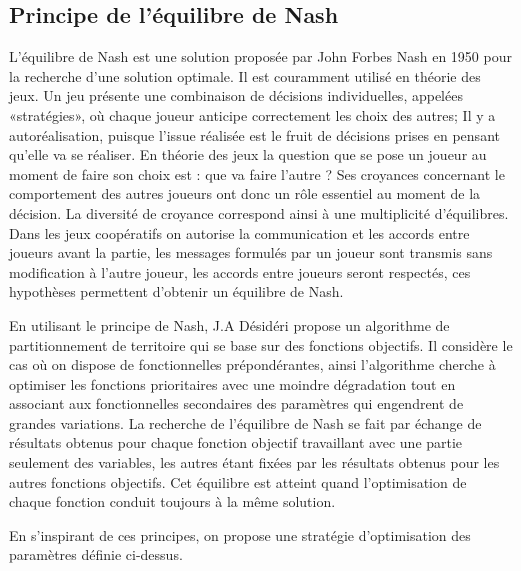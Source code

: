 
 \subsection{Principe de l’\'{e}quilibre de Nash}
 
L'\'{e}quilibre de Nash est une solution propos\'{e}e par John Forbes Nash en 1950 \citep{depriester1950johnnash} pour la recherche d’une solution optimale. Il est couramment utilis\'{e} en th\'{e}orie des jeux. Un jeu pr\'{e}sente une combinaison de d\'{e}cisions individuelles, appel\'{e}es «strat\'{e}gies», où chaque joueur anticipe correctement les choix des autres; Il y a autor\'{e}alisation, puisque l'issue r\'{e}alis\'{e}e est le fruit de d\'{e}cisions prises en pensant qu'elle va se r\'{e}aliser. En th\'{e}orie des jeux la question que se pose un joueur au moment de faire son choix est : que va faire l'autre ? Ses croyances concernant le comportement des autres joueurs ont donc un rôle essentiel au moment de la d\'{e}cision. La diversit\'{e} de croyance correspond ainsi \`{a} une multiplicit\'{e} d'\'{e}quilibres. Dans les jeux coop\'{e}ratifs on autorise la communication et les accords entre joueurs avant la partie, les messages formul\'{e}s par un joueur sont transmis sans modification \`{a} l'autre joueur, les accords entre joueurs seront respect\'{e}s, ces hypoth\`{e}ses permettent d'obtenir un \'{e}quilibre de Nash.

En utilisant le principe de Nash, J.A D\'{e}sid\'{e}ri \citep{depriester2007jeanantoine} propose un algorithme de partitionnement de territoire qui se base sur des fonctions objectifs. Il consid\`{e}re le cas où on dispose de fonctionnelles pr\'{e}pond\'{e}rantes, ainsi l'algorithme cherche \`{a} optimiser les fonctions prioritaires avec une moindre d\'{e}gradation tout en associant aux fonctionnelles secondaires des param\`{e}tres qui engendrent de grandes variations. La recherche de l’\'{e}quilibre de Nash se fait par \'{e}change de r\'{e}sultats obtenus pour chaque fonction objectif travaillant avec une partie seulement des variables, les autres \'{e}tant fix\'{e}es par les r\'{e}sultats obtenus pour les autres fonctions objectifs. Cet \'{e}quilibre est atteint quand l’optimisation de chaque fonction conduit toujours \`{a} la m\^{e}me solution.

En s'inspirant de ces principes, on propose une strat\'{e}gie d'optimisation des param\`{e}tres définie ci-dessus.